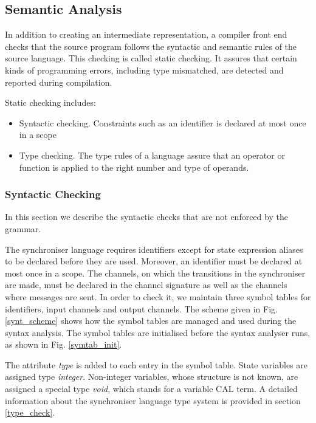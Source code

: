 

\subsection{Semantic Analysis}
In addition to creating an intermediate representation, a compiler front end checks that the source program follows the syntactic and semantic rules of the source language. This checking is called static checking. It assures that certain kinds of programming errors, including type mismatched, are detected and reported during compilation.

Static checking includes:
\begin{itemize}
\item Syntactic checking. Constraints such as an identifier is declared at most once in a scope
\item Type checking. The type rules of a language assure that an operator or function is applied to the right number and type of operands.
\end{itemize}

  \subsubsection{Syntactic Checking}
In this section we describe the syntactic checks that are not enforced by the grammar.

The synchroniser language requires identifiers except for state expression aliases to be declared before they are used. Moreover, an identifier must be declared at most once in a scope. The channels, on which the transitions in the synchroniser are made, must be declared in the channel signature as well as the channels where messages are sent. In order to check it, we maintain three symbol tables for identifiers, input channels and output channels. The scheme given in Fig. \ref{synt_scheme} shows how the symbol tables are managed and used during the syntax analysis. The symbol tables are initialised before the syntax analyser runs, as shown in Fig. \ref{symtab_init}.

The attribute \emph{type} is added to each entry in the symbol table. State variables are assigned type \emph{integer}. Non-integer variables, whose structure is not known, are assigned a special type \emph{void}, which stands for a variable CAL term. A detailed information about the synchroniser language type system is provided in section \ref{type_check}.


